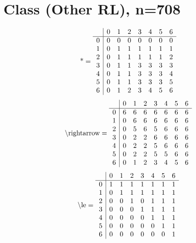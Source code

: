 \documentclass[11pt]{article}
\begin{document}
\section{Class (Other RL), n=708}
\[\text{*} = 
\begin{array}{r | r r r r r r r}
 & 0 & 1 & 2 & 3 & 4 & 5 & 6 \\ \hline
0 & 0 & 0 & 0 & 0 & 0 & 0 & 0 \\
1 & 0 & 1 & 1 & 1 & 1 & 1 & 1 \\
2 & 0 & 1 & 1 & 1 & 1 & 1 & 2 \\
3 & 0 & 1 & 1 & 3 & 3 & 3 & 3 \\
4 & 0 & 1 & 1 & 3 & 3 & 3 & 4 \\
5 & 0 & 1 & 1 & 3 & 3 & 3 & 5 \\
6 & 0 & 1 & 2 & 3 & 4 & 5 & 6 \\
\end{array}
\]
\[\text{\textbackslash rightarrow} = 
\begin{array}{r | r r r r r r r}
 & 0 & 1 & 2 & 3 & 4 & 5 & 6 \\ \hline
0 & 6 & 6 & 6 & 6 & 6 & 6 & 6 \\
1 & 0 & 6 & 6 & 6 & 6 & 6 & 6 \\
2 & 0 & 5 & 6 & 5 & 6 & 6 & 6 \\
3 & 0 & 2 & 2 & 6 & 6 & 6 & 6 \\
4 & 0 & 2 & 2 & 5 & 6 & 6 & 6 \\
5 & 0 & 2 & 2 & 5 & 5 & 6 & 6 \\
6 & 0 & 1 & 2 & 3 & 4 & 5 & 6 \\
\end{array}
\]
\[\text{\textbackslash le} = 
\begin{array}{r | r r r r r r r}
 & 0 & 1 & 2 & 3 & 4 & 5 & 6 \\ \hline
0 & 1 & 1 & 1 & 1 & 1 & 1 & 1 \\
1 & 0 & 1 & 1 & 1 & 1 & 1 & 1 \\
2 & 0 & 0 & 1 & 0 & 1 & 1 & 1 \\
3 & 0 & 0 & 0 & 1 & 1 & 1 & 1 \\
4 & 0 & 0 & 0 & 0 & 1 & 1 & 1 \\
5 & 0 & 0 & 0 & 0 & 0 & 1 & 1 \\
6 & 0 & 0 & 0 & 0 & 0 & 0 & 1 \\
\end{array}
\]
\end{document}
